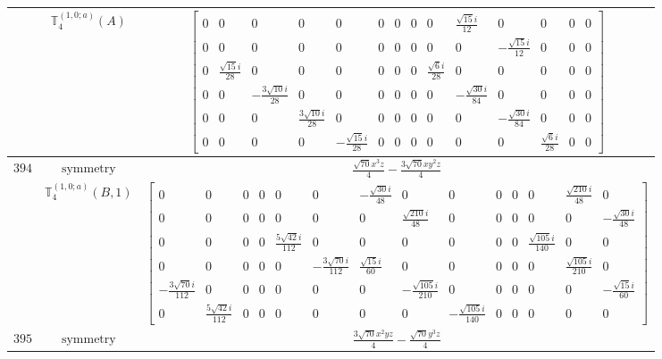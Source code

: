 \documentclass[fleqn,8pt,landscape]{jsarticle}
\begin{document}
\begin{longtable}{ccc}
$  $ & $ \mathbb{T}_{4}^{(1,0;a)}(A) $ & $ \begin{bmatrix} 0 & 0 & 0 & 0 & 0 & 0 & 0 & 0 & 0 & \frac{\sqrt{15} i}{12} & 0 & 0 & 0 & 0 \\ 0 & 0 & 0 & 0 & 0 & 0 & 0 & 0 & 0 & 0 & - \frac{\sqrt{15} i}{12} & 0 & 0 & 0 \\ 0 & \frac{\sqrt{15} i}{28} & 0 & 0 & 0 & 0 & 0 & 0 & \frac{\sqrt{6} i}{28} & 0 & 0 & 0 & 0 & 0 \\ 0 & 0 & - \frac{3 \sqrt{10} i}{28} & 0 & 0 & 0 & 0 & 0 & 0 & - \frac{\sqrt{30} i}{84} & 0 & 0 & 0 & 0 \\ 0 & 0 & 0 & \frac{3 \sqrt{10} i}{28} & 0 & 0 & 0 & 0 & 0 & 0 & - \frac{\sqrt{30} i}{84} & 0 & 0 & 0 \\ 0 & 0 & 0 & 0 & - \frac{\sqrt{15} i}{28} & 0 & 0 & 0 & 0 & 0 & 0 & \frac{\sqrt{6} i}{28} & 0 & 0 \end{bmatrix} $ \\ \hline
$ 394 $ & $ \text{symmetry} $ & $ \frac{\sqrt{70} x^{3} z}{4} - \frac{3 \sqrt{70} x y^{2} z}{4} $ \\
$  $ & $ \mathbb{T}_{4}^{(1,0;a)}(B,1) $ & $ \begin{bmatrix} 0 & 0 & 0 & 0 & 0 & 0 & - \frac{\sqrt{30} i}{48} & 0 & 0 & 0 & 0 & 0 & \frac{\sqrt{210} i}{48} & 0 \\ 0 & 0 & 0 & 0 & 0 & 0 & 0 & \frac{\sqrt{210} i}{48} & 0 & 0 & 0 & 0 & 0 & - \frac{\sqrt{30} i}{48} \\ 0 & 0 & 0 & 0 & \frac{5 \sqrt{42} i}{112} & 0 & 0 & 0 & 0 & 0 & 0 & \frac{\sqrt{105} i}{140} & 0 & 0 \\ 0 & 0 & 0 & 0 & 0 & - \frac{3 \sqrt{70} i}{112} & \frac{\sqrt{15} i}{60} & 0 & 0 & 0 & 0 & 0 & \frac{\sqrt{105} i}{210} & 0 \\ - \frac{3 \sqrt{70} i}{112} & 0 & 0 & 0 & 0 & 0 & 0 & - \frac{\sqrt{105} i}{210} & 0 & 0 & 0 & 0 & 0 & - \frac{\sqrt{15} i}{60} \\ 0 & \frac{5 \sqrt{42} i}{112} & 0 & 0 & 0 & 0 & 0 & 0 & - \frac{\sqrt{105} i}{140} & 0 & 0 & 0 & 0 & 0 \end{bmatrix} $ \\ \hline
$ 395 $ & $ \text{symmetry} $ & $ \frac{3 \sqrt{70} x^{2} y z}{4} - \frac{\sqrt{70} y^{3} z}{4} $ \\

\end{longtable}
\end{document}

